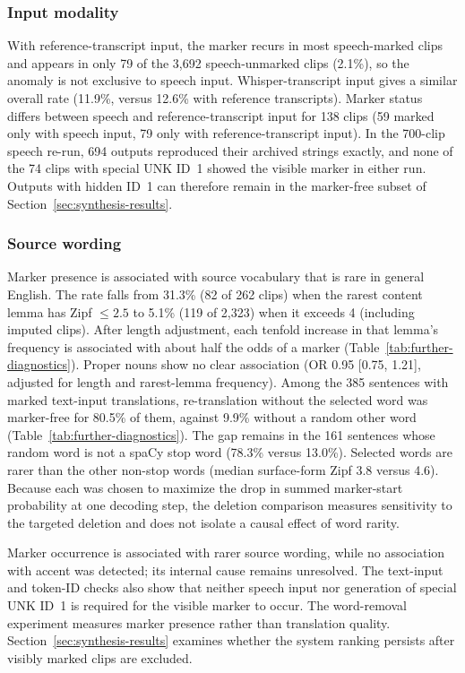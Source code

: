 \subsubsection{Input modality}
\label{sec:further-diagnostic-results}
With reference-transcript input, the marker recurs in most speech-marked
clips and appears in only 79 of the 3,692 speech-unmarked clips (2.1\%), so
the anomaly is not exclusive to speech input. Whisper-transcript input gives
a similar overall rate (11.9\%, versus 12.6\% with reference transcripts).
Marker status differs between speech and reference-transcript input for 138
clips (59 marked only with speech input, 79 only with reference-transcript
input). In the
700-clip speech re-run, 694 outputs reproduced their archived strings exactly,
and none of the 74 clips with special UNK ID~1 showed the visible marker in
either run. Outputs with hidden ID~1 can therefore remain in the marker-free
subset of Section~\ref{sec:synthesis-results}.

\subsubsection{Source wording}
Marker presence is associated with source vocabulary
that is rare in general English. The rate falls from 31.3\% (82 of 262 clips)
when the rarest content lemma has Zipf $\le 2.5$ to 5.1\% (119 of 2,323) when
it exceeds 4 (including imputed clips). After length adjustment, each
tenfold increase in that lemma's frequency is associated with about half the
odds of a marker (Table~\ref{tab:further-diagnostics}). Proper nouns show no
clear association (OR 0.95 [0.75, 1.21], adjusted for length and rarest-lemma
frequency). Among the 385 sentences with marked text-input translations,
re-translation without the selected word was marker-free for 80.5\% of them,
against 9.9\% without a random other word
(Table~\ref{tab:further-diagnostics}). The gap remains in the 161 sentences
whose random word is not a spaCy stop word (78.3\% versus 13.0\%). Selected words are rarer than the other non-stop words
(median surface-form Zipf 3.8 versus 4.6). Because each was chosen to
maximize the drop in summed marker-start probability at one decoding step,
the deletion comparison measures sensitivity to the targeted deletion and
does not isolate a causal effect of word rarity.

Marker occurrence is associated with rarer source wording, while no
association with accent was detected; its internal cause remains unresolved. The text-input and token-ID checks also show that
neither speech input nor generation of special UNK ID~1 is required for the
visible marker to occur. The word-removal experiment measures marker
presence rather than translation quality. Section~\ref{sec:synthesis-results} examines whether
the system ranking persists after visibly marked clips are excluded.
